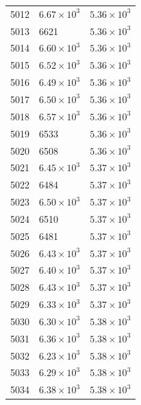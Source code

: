 \begin{table}[H]
\begin{tabular}{lll}
5012 & $\displaystyle 6.67 \times 10^{3}$ & $\displaystyle 5.36 \times 10^{3}$ \\
5013 & 6621 & $\displaystyle 5.36 \times 10^{3}$ \\
5014 & $\displaystyle 6.60 \times 10^{3}$ & $\displaystyle 5.36 \times 10^{3}$ \\
5015 & $\displaystyle 6.52 \times 10^{3}$ & $\displaystyle 5.36 \times 10^{3}$ \\
5016 & $\displaystyle 6.49 \times 10^{3}$ & $\displaystyle 5.36 \times 10^{3}$ \\
5017 & $\displaystyle 6.50 \times 10^{3}$ & $\displaystyle 5.36 \times 10^{3}$ \\
5018 & $\displaystyle 6.57 \times 10^{3}$ & $\displaystyle 5.36 \times 10^{3}$ \\
5019 & 6533 & $\displaystyle 5.36 \times 10^{3}$ \\
5020 & 6508 & $\displaystyle 5.36 \times 10^{3}$ \\
5021 & $\displaystyle 6.45 \times 10^{3}$ & $\displaystyle 5.37 \times 10^{3}$ \\
5022 & 6484 & $\displaystyle 5.37 \times 10^{3}$ \\
5023 & $\displaystyle 6.50 \times 10^{3}$ & $\displaystyle 5.37 \times 10^{3}$ \\
5024 & 6510 & $\displaystyle 5.37 \times 10^{3}$ \\
5025 & 6481 & $\displaystyle 5.37 \times 10^{3}$ \\
5026 & $\displaystyle 6.43 \times 10^{3}$ & $\displaystyle 5.37 \times 10^{3}$ \\
5027 & $\displaystyle 6.40 \times 10^{3}$ & $\displaystyle 5.37 \times 10^{3}$ \\
5028 & $\displaystyle 6.43 \times 10^{3}$ & $\displaystyle 5.37 \times 10^{3}$ \\
5029 & $\displaystyle 6.33 \times 10^{3}$ & $\displaystyle 5.37 \times 10^{3}$ \\
5030 & $\displaystyle 6.30 \times 10^{3}$ & $\displaystyle 5.38 \times 10^{3}$ \\
5031 & $\displaystyle 6.36 \times 10^{3}$ & $\displaystyle 5.38 \times 10^{3}$ \\
5032 & $\displaystyle 6.23 \times 10^{3}$ & $\displaystyle 5.38 \times 10^{3}$ \\
5033 & $\displaystyle 6.29 \times 10^{3}$ & $\displaystyle 5.38 \times 10^{3}$ \\
5034 & $\displaystyle 6.38 \times 10^{3}$ & $\displaystyle 5.38 \times 10^{3}$ \\

\end{tabular}
\end{table}

